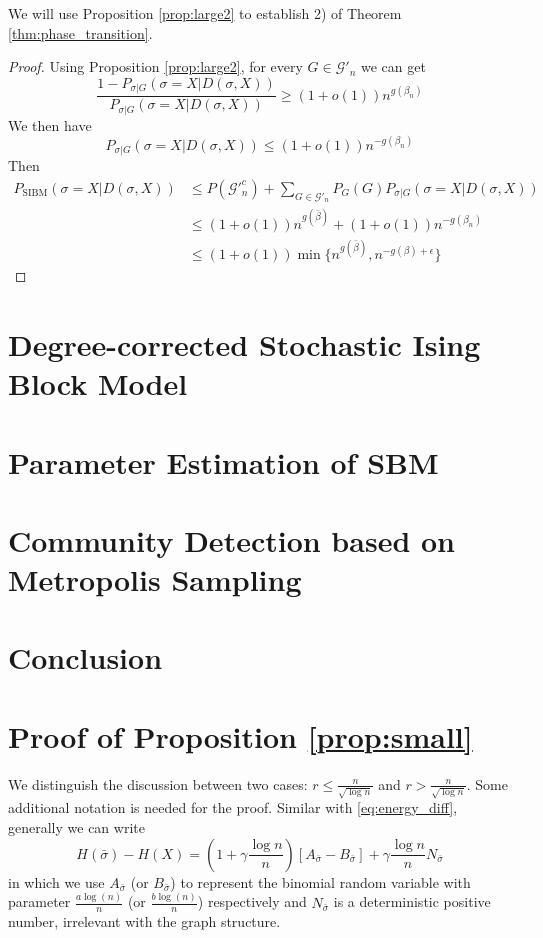 \documentclass[journal]{IEEEtran}
\newcommand{\A}{\frac{a \log(n)}{n}}
\newcommand{\B}{\frac{b \log(n)}{n}}
\newcommand{\cG}{\mathcal{G}}
\DeclareMathOperator{\SIBM}{SIBM}
\begin{document}
We will use Proposition \ref{prop:large2} to establish 2) of Theorem \ref{thm:phase_transition}.
\begin{proof}
	Using Proposition \ref{prop:large2}, for every $G \in \cG'_n$
	we can get
	$$
	\frac{1-P_{\sigma | G}(\sigma=X | D(\sigma, X))}{P_{\sigma | G}(\sigma=X | D(\sigma, X))}\geq (1+o(1))n^{g(\beta_n)}
	$$
	We then have
	$$
	P_{\sigma | G}(\sigma=X| D(\sigma, X)) \leq (1+o(1)) n^{-g(\beta_n)}
	$$
	Then
	\begin{align*}
	P_{\SIBM}(\sigma=X| D(\sigma, X)) & \leq P(\cG'^c_n) + \sum_{G\in \cG'_n}P_G(G) P_{\sigma|G}(\sigma=X| D(\sigma, X))\\
	& \leq (1+o(1))n^{g(\bar{\beta})} + (1+o(1)) n^{-g(\beta_n)}\\
	& \leq (1+o(1)) \min\{n^{g(\bar{\beta})},n^{-g(\beta) + \epsilon}  \}
	\end{align*}
\end{proof}
\section{Degree-corrected Stochastic Ising Block Model}\label{sec:dcsibm}
\section{Parameter Estimation of SBM}\label{sec:psbm}
\section{Community Detection based on Metropolis Sampling}\label{sec:ms}
\section{Conclusion}


\appendix
\section*{Proof of Proposition \ref{prop:small}}
We distinguish the discussion between two cases: $r\leq \frac{n}{\sqrt{\log n}}$
and $r > \frac{n}{\sqrt{\log n}}$. Some additional notation is needed for the proof.
Similar with \eqref{eq:energy_diff}, generally we can write
$$
H(\bar{\sigma}) - H(X)=
(1 + \gamma \frac{ \log n}{n})[A_{\bar{\sigma}} - B_{\bar{\sigma}}] + \gamma\frac{ \log n}{n} N_{\bar{\sigma}}
$$
in which we use $A_{\bar{\sigma}}$ (or $B_{\bar{\sigma}}$) to represent the binomial random variable with parameter $\A$ (or $\B$)
respectively and $N_{\bar{\sigma}}$ is a deterministic positive number, irrelevant with the graph structure.
\end{document}
